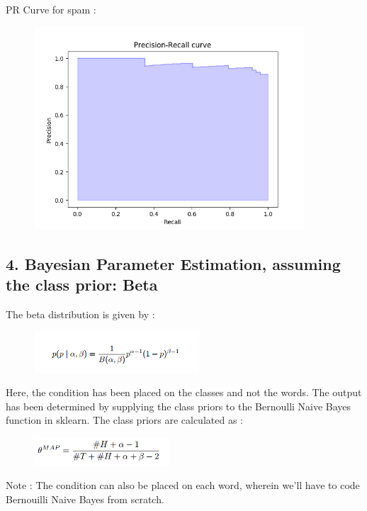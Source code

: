 \documentclass[paper=a4, fontsize=11pt]{scrartcl}
\numberwithin{equation}{section}		%
\numberwithin{figure}{section}			%
\numberwithin{table}{section}				%
\begin{document}
PR Curve for spam :
\graphicspath{ {../Dataset/2_NaiveBayes/Visualisations/} }
\begin{figure}[H]
	\centering
  \includegraphics[width=0.9\textwidth]{dir}
\end{figure}

\subsection*{4. Bayesian Parameter Estimation, assuming the class prior: Beta}
The beta distribution is given by :
\graphicspath{ {../Dataset/2_NaiveBayes/Visualisations/} }
\begin{figure}[H]
	\centering
  \includegraphics[width=0.55\textwidth]{beta}
\end{figure}

Here, the condition has been placed on the classes and not the words. The output has been determined by supplying the class priors to the Bernoulli Naive Bayes function in sklearn. The class priors are calculated as :
\graphicspath{ {../Dataset/2_NaiveBayes/Visualisations/} }
\begin{figure}[H]
	\centering
  \includegraphics[width=0.45\textwidth]{beta2}
\end{figure}

Note : The condition can also be placed on each word, wherein we'll have to code Bernouilli Naive Bayes from scratch.
\end{document}

